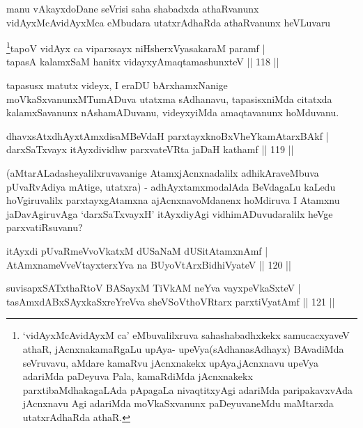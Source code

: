 \begin{artha}
manu vAkayxdoDane seVrisi saha shabadxda athaRvanunx vidAyxMcAvidAyxMca eMbudara utatxrAdhaRda athaRvanunx heVLuvaru
\end{artha}


\begin{shl}
\footnote{`vidAyxMcAvidAyxM ca' eMbuvalilxruva sahashabadhxkekx samucacxyaveV athaR, jAcnxnakamaRgaLu upAya- upeVya(sAdhanasAdhayx) BAvadiMda seVruvavu, aMdare kamaRvu jAcnxnakekx upAya,jAcnxnavu upeVya adariMda paDeyuva Pala, kamaRdiMda jAcnxnakekx parxtibaMdhakagaLAda pApagaLa nivaqtitxyAgi adariMda paripakavxvAda jAcnxnavu Agi adariMda moVkaSxvanunx paDeyuvaneMdu maMtarxda utatxrAdhaRda athaR.}tapoV vidAyx ca viparxsayx niHsherxVyasakaraM paramf |\\
tapasA kalamxSaM hanitx vidayxyA\s maqtamashunxteV \hfill || 118 ||
\end{shl}

\begin{artha}
tapasusx matutx videyx, I eraDU bArxhamxNanige moVkaSxvanunxMTumADuva utatxma sAdhanavu, tapasisxniMda citatxda kalamxSavanunx nAshamADuvanu, videyxyiMda amaqtavanunx hoMduvanu.
\end{artha}

\begin{shl}
dhavxsAtxdhAyxtAmxdisaMBeVdaH parxtayxknoBxVheYkamAtarxBAkf |\\
darxSaTxvayx itAyxdividhw parxvateVRta jaDaH kathamf \hfill || 119 ||
\end{shl}

\begin{artha}
(aMtarALadasheyalilxruvavanige AtamxjAcnxnadalilx adhikAraveMbuva pUvaRvAdiya mAtige, utatxra) - adhAyxtamxmodalAda BeVdagaLu kaLedu hoVgiruvalilx parxtayxgAtamxna ajAcnxnavoMdanenx hoMdiruva I Atamxnu jaDavAgiruvAga `darxSaTxvayxH' itAyxdiyAgi vidhimADuvudaralilx heVge parxvatiRsuvanu?
\end{artha}


\begin{shl}
itAyxdi pUvaRmeVvoVkatxM dUSaNaM dUSitAtamxnAmf |\\
AtAmxnameVveVtayxterxYva na BUyoV\s tArxBidhiVyateV \hfill || 120 ||
\end{shl}

\begin{shl}
suvisapxSATxthaRtoV BASayxM TiVkAM neYva vayxpeVkaSxteV |\\
tasAmxdABxSAyxkaSxreYreVva sheVSoV\s thoVR\s tarx parxtiVyatAmf \hfill || 121 ||
\end{shl}

